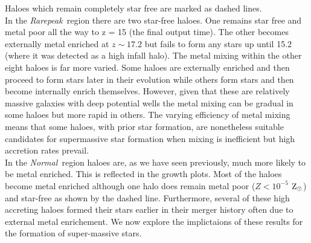 \documentclass[graphics, twocolumn, usenatbib]{mn2e}
\newcommand{\zsolarc} {$\rm{Z_{\odot}}$}
\newcommand{\rarepeak} {\textit{Rarepeak~}}
\newcommand{\normal} {\textit{Normal~}}
\begin{document}
Haloes which remain completely star free are marked as dashed lines. \\
\indent In the \rarepeak region there are two
star-free haloes. One remains star free and metal poor all the way to z = 15 (the final output time).
The other becomes externally metal enriched at $z \sim 17.2$ but fails to form any stars up until 15.2
(where it was detected as a high infall halo). The metal mixing within the other eight haloes is far
more varied. Some haloes are externally enriched and then proceed to form stars later in their
evolution while others form stars and then become internally enrich themselves. 
However, given that these are relatively massive galaxies with deep potential wells
the metal mixing can be gradual in some haloes but more rapid in others. The varying efficiency of
metal mixing means that some haloes, with prior star formation, are nonetheless suitable candidates
for supermassive star formation when mixing is inefficient but high accretion rates prevail. \\
\indent In the \normal region haloes are, as we have seen previously, much more likely to be
metal enriched. This is reflected in the growth plots. Most of the haloes become metal enriched
although one halo does remain metal poor ($Z < 10^{-5}$ \zsolarc) and star-free as shown by the dashed
line. Furthermore, several of these high accreting haloes formed their stars earlier in their merger
history often due to external metal enrichement. We now explore the implictaions of these results for
the formation of super-massive stars. 
\end{document}
